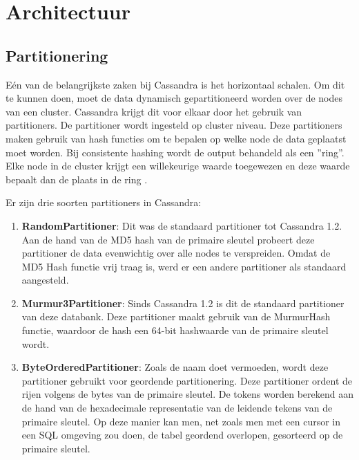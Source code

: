 \chapter{Architectuur}
\label{ch:cassandra_architectuur}

\section{Partitionering}
Eén van de belangrijkste zaken bij Cassandra is het horizontaal schalen.
Om dit te kunnen doen, moet de data dynamisch gepartitioneerd worden over de nodes van een cluster.
Cassandra krijgt dit voor elkaar door het gebruik van partitioners.
De partitioner wordt ingesteld op cluster niveau.
Deze partitioners maken gebruik van hash functies om te bepalen op welke node de data geplaatst moet worden.
Bij consistente hashing wordt de output behandeld als een ''ring''.
Elke node in de cluster krijgt een willekeurige waarde toegewezen en deze waarde bepaalt dan de plaats in de ring \citep{lakshman2010cassandra}.


Er zijn drie soorten partitioners in Cassandra:

\begin{enumerate}
	\item \textbf{RandomPartitioner}:
	Dit was de standaard partitioner tot Cassandra 1.2.
	Aan de hand van de MD5 hash van de primaire sleutel probeert deze partitioner de data evenwichtig over alle nodes te verspreiden.
	Omdat de MD5 Hash functie vrij traag is, werd er een andere partitioner als standaard aangesteld.
	
	\item \textbf{Murmur3Partitioner}:
	Sinds Cassandra 1.2 is dit de standaard partitioner van deze databank.
	Deze partitioner maakt gebruik van de MurmurHash functie, waardoor de hash een 64-bit hashwaarde van de primaire sleutel wordt.
	
	\item \textbf{ByteOrderedPartitioner}:
	Zoals de naam doet vermoeden, wordt deze partitioner gebruikt voor geordende partitionering.
	Deze partitioner ordent de rijen volgens de bytes van de primaire sleutel.
	De tokens worden berekend aan de hand van de hexadecimale representatie van de leidende tekens van de primaire sleutel.
	Op deze manier kan men, net zoals men met een cursor in een SQL omgeving zou doen, de tabel geordend overlopen, gesorteerd op de primaire sleutel.
	
\end{enumerate}

